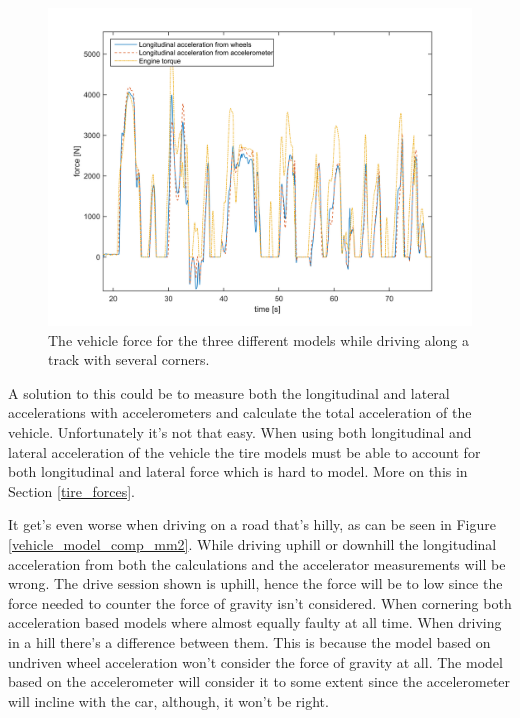\begin{figure}[h]
	\centering
	\includegraphics[width=1\textwidth]{Pictures/vehicle_model_comp_race}
	\caption{The vehicle force for the three different models while driving along a track with several corners.}
	\label{vehicle_model_comp_race}
\end{figure}

A solution to this could be to measure both the longitudinal and lateral accelerations with accelerometers and calculate the total acceleration of the vehicle. Unfortunately it's not that easy. When using both longitudinal and lateral acceleration of the vehicle the tire models must be able to account for both longitudinal and lateral force which is hard to model. More on this in Section \ref{tire_forces}.

It get's even worse when driving on a road that's hilly, as can be seen in Figure \ref{vehicle_model_comp_mm2}. While driving uphill or downhill the longitudinal acceleration from both the calculations and the accelerator measurements will be wrong.  The drive session shown is uphill, hence the force will be to low since the force needed to counter the force of gravity isn't considered. When cornering both acceleration based models where almost equally faulty at all time. When driving in a hill there's a difference between them. This is because the model based on undriven wheel acceleration won't consider the force of gravity at all. The model based on the accelerometer will consider it to some extent since the accelerometer will incline with the car, although, it won't be right.

